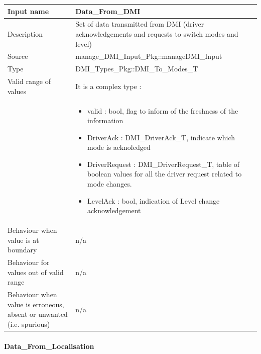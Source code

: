 \begin{longtable}{p{}p{}}
\toprule
Input name				& Data\_From\_DMI \\
\midrule
Description				& Set of data transmitted from DMI  (driver acknowledgements and requests to  switch modes and level) \\
\midrule
Source					& manage\_DMI\_Input\_Pkg::manageDMI\_Input \\ 
\midrule
Type					& DMI\_Types\_Pkg::DMI\_To\_Modes\_T \\
\midrule
Valid range of values	& It is a complex type : \\
& \begin{itemize}
\item valid :  bool,  flag to inform of the freshness of the information
\item DriverAck : DMI\_DriverAck\_T, indicate which mode is acknoledged
\item DriverRequest : DMI\_DriverRequest\_T, table of boolean values for all the driver request related to  mode changes.
\item LevelAck : bool, indication of Level  change acknowledgement
\end{itemize} \\
\midrule
Behaviour when value is at boundary	& n/a \\ 
\midrule
Behaviour for values out of valid range	& n/a \\ 
\midrule
Behaviour when value is erroneous, absent or unwanted (i.e. spurious) & n/a \\ 
\bottomrule
\end{longtable}

\paragraph{Data\_From\_Localisation}

